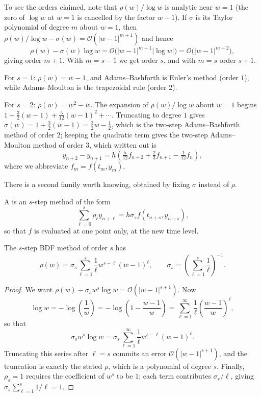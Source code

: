 \documentclass[a4paper]{scrartcl}
\providecommand{\abs}[1]{\left\lvert#1\right\rvert}
\renewcommand{\abs}[1]{\left\lvert#1\right\rvert}
\begin{document}
To see the orders claimed, note that $\rho(w)/\log w$ is analytic near $w=1$ (the zero of $\log w$ at $w=1$ is cancelled by the factor $w-1$). If $\sigma$ is its Taylor polynomial of degree $m$ about $w=1$, then $\rho(w)/\log w - \sigma(w) = \mathcal{O}(\abs{w-1}^{m+1})$ and hence
$$
\rho(w) - \sigma(w)\log w = \mathcal{O}\big(\abs{w-1}^{m+1}\abs{\log w}\big) = \mathcal{O}\big(\abs{w-1}^{m+2}\big),
$$
giving order $m+1$. With $m = s-1$ we get order $s$, and with $m=s$ order $s+1$.

\begin{example}
  For $s = 1$: $\rho(w) = w-1$, and Adams--Bashforth is Euler's method (order $1$), while Adams--Moulton is the trapezoidal rule (order $2$).

  For $s = 2$: $\rho(w) = w^2 - w$. The expansion of $\rho(w)/\log w$ about $w = 1$ begins $1 + \tfrac32 (w-1) + \tfrac{5}{12}(w-1)^2 + \cdots$. Truncating to degree $1$ gives $\sigma(w) = 1 + \tfrac32(w-1) = \tfrac32 w - \tfrac12$, which is the two-step Adams--Bashforth method of order $2$; keeping the quadratic term gives the two-step Adams--Moulton method of order $3$, which written out is
  $$
  y_{n+2} - y_{n+1} = h\left(\tfrac{5}{12}f_{n+2} + \tfrac{2}{3}f_{n+1} - \tfrac1{12}f_n\right),
  $$
  where we abbreviate $f_m = f(t_m,y_m)$.
\end{example}

There is a second family worth knowing, obtained by fixing $\sigma$ instead of $\rho$.

\begin{definition}
  A  is an $s$-step method of the form
  $$
  \sum_{\ell=0}^{s}\rho_\ell y_{n+\ell} = h\sigma_s f(t_{n+s}, y_{n+s}),
  $$
  so that $f$ is evaluated at one point only, at the new time level.
\end{definition}

\begin{theorem}
  The $s$-step BDF method of order $s$ has
  $$
  \rho(w) = \sigma_s\sum_{\ell=1}^{s}\frac{1}{\ell}w^{s-\ell}(w-1)^{\ell}, \qquad \sigma_s = \left(\sum_{\ell=1}^s \frac{1}{\ell}\right)^{-1}.
  $$
\end{theorem}
\begin{proof}
  We want $\rho(w) - \sigma_s w^s \log w = \mathcal{O}(\abs{w-1}^{s+1})$. Now
  $$
  \log w = -\log\left(\frac{1}{w}\right) = -\log\left(1 - \frac{w-1}{w}\right) = \sum_{\ell = 1}^{\infty}\frac{1}{\ell}\left(\frac{w-1}{w}\right)^{\ell},
  $$
  so that
  $$
  \sigma_s w^s \log w = \sigma_s\sum_{\ell=1}^{\infty}\frac{1}{\ell}w^{s-\ell}(w-1)^\ell .
  $$
  Truncating this series after $\ell = s$ commits an error $\mathcal{O}(\abs{w-1}^{s+1})$, and the truncation is exactly the stated $\rho$, which is a polynomial of degree $s$. Finally, $\rho_s = 1$ requires the coefficient of $w^s$ to be $1$; each term contributes $\sigma_s/\ell$, giving $\sigma_s\sum_{\ell=1}^s 1/\ell = 1$.
\end{proof}
\end{document}
